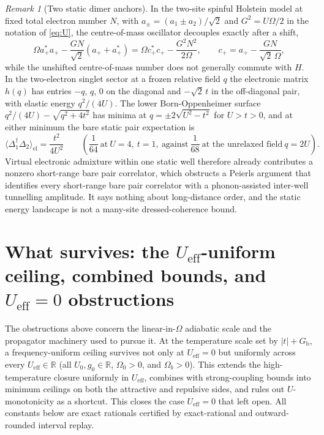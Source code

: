 \documentclass[11pt]{article}
\theoremstyle{definition}
\theoremstyle{remark}
\newtheorem{remark}[theorem]{Remark}
\newcommand{\R}{\mathbb{R}}
\newcommand{\eff}{\mathrm{eff}}
\newcommand{\Gb}{G_{\mathrm{b}}}
\newcommand{\Ueff}{U_{\eff}}
\begin{document}
\begin{remark}[Two static dimer anchors]
\label{rem:dimer}
In the two-site spinful Holstein model at fixed total electron number $N$, with
$a_\pm=(a_1\pm a_2)/\sqrt2$ and $G^2=U\Omega/2$ in the notation of \eqref{eq:U}, the
centre-of-mass oscillator decouples exactly after a shift,
\begin{equation}
\Omega a_+^*a_+-\frac{GN}{\sqrt2}(a_++a_+^*)=\Omega c_+^*c_+-\frac{G^2N^2}{2\Omega},
\qquad c_+=a_+-\frac{GN}{\sqrt2\,\Omega},
\label{eq:com}
\end{equation}
while the unshifted centre-of-mass number does not generally commute with $H$. In the
two-electron singlet sector at a frozen relative field $q$ the electronic matrix
$h(q)$ has entries $-q$, $q$, $0$ on the diagonal and $-\sqrt2\,t$ in the off-diagonal
pair, with elastic energy $q^2/(4U)$. The lower Born-Oppenheimer surface
$q^2/(4U)-\sqrt{q^2+4t^2}$ has minima at $q=\pm2\sqrt{U^2-t^2}$ for $U>t>0$, and at
either minimum the bare static pair expectation is
\begin{equation}
\langle\Delta_1^\dagger\Delta_2\rangle_{\mathrm{el}}=\frac{t^2}{4U^2}
\qquad\left(\frac{1}{64}\ \text{at}\ U=4,\ t=1,\ \text{against}\ \frac{1}{68}
\ \text{at the unrelaxed field}\ q=2U\right).
\label{eq:dimermin}
\end{equation}
Virtual electronic admixture within one static well therefore already contributes a
nonzero short-range bare pair correlator, which obstructs a Peierls argument that
identifies every short-range bare pair correlator with a phonon-assisted inter-well
tunnelling amplitude. It says nothing about long-distance order, and the static
energy landscape is not a many-site dressed-coherence bound.
\end{remark}

\section{What survives: the \texorpdfstring{$\Ueff$}{U\_eff}-uniform ceiling,
combined bounds, and \texorpdfstring{$\Ueff=0$}{U\_eff=0} obstructions}
\label{sec:survives}

The obstructions above concern the linear-in-$\Omega$ adiabatic scale and the
propagator machinery used to pursue it. At the temperature scale set by $|t|+\Gb$, a
frequency-uniform ceiling survives not only at $\Ueff=0$ but uniformly across every
$\Ueff\in\R$ (all $U_0,g_0\in\R$, $\Omega_0>0$, and $\Omega_b>0$). This extends the
high-temperature closure uniformly in $\Ueff$, combines with strong-coupling bounds
into minimum ceilings on both the attractive and repulsive sides, and rules out
$U$-monotonicity as a shortcut. This closes the case $\Ueff=0$ that \cite{sshbond3}
left open. All constants below are exact rationals certified by exact-rational and
outward-rounded interval replay.
\end{document}
